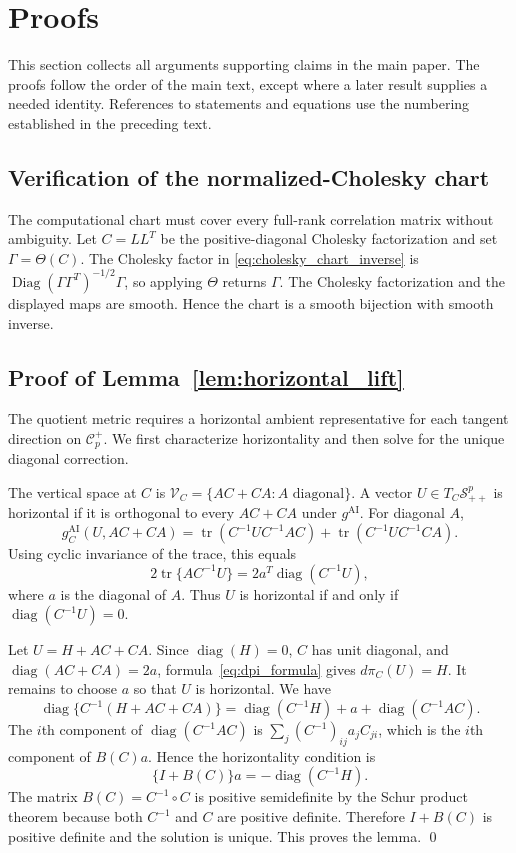\documentclass[
  12pt]{article}
\newcommand{\SPD}{\mathcal S_{++}}
\newcommand{\Corr}{\mathcal C^+}
\newcommand{\diag}{\operatorname{diag}}
\newcommand{\Diag}{\operatorname{Diag}}
\newcommand{\tr}{\operatorname{tr}}
\newcommand{\AI}{\mathrm{AI}}
\newcommand{\Had}{\circ}
\begin{document}
\section{Proofs}\label{sec:supp_proofs}

This section collects all arguments supporting claims in the main paper. The proofs follow the order of the main text, except where a later result supplies a needed identity. References to statements and equations use the numbering established in the preceding text.

\subsection{Verification of the normalized-Cholesky chart}\label{sec:supp_chart}

The computational chart must cover every full-rank correlation matrix without ambiguity. Let $C=L L^T$ be the positive-diagonal Cholesky factorization and set $\Gamma=\Theta(C)$. The Cholesky factor in \eqref{eq:cholesky_chart_inverse} is $\Diag(\Gamma\Gamma^T)^{-1/2}\Gamma$, so applying $\Theta$ returns $\Gamma$. The Cholesky factorization and the displayed maps are smooth. Hence the chart is a smooth bijection with smooth inverse.

\subsection{Proof of Lemma~\ref{lem:horizontal_lift}}

The quotient metric requires a horizontal ambient representative for each tangent direction on $\Corr_p$. We first characterize horizontality and then solve for the unique diagonal correction.

The vertical space at $C$ is $\mathcal V_C=\{AC+CA:A\text{ diagonal}\}$. A vector $U\in T_C\SPD^p$ is horizontal if it is orthogonal to every $AC+CA$ under $g^{\AI}$. For diagonal $A$,
\[
g_C^{\AI}(U,AC+CA)=\tr(C^{-1}U C^{-1}AC)+\tr(C^{-1}UC^{-1}CA).
\]
Using cyclic invariance of the trace, this equals
\[
2\tr\{A C^{-1}U\}=2a^T\diag(C^{-1}U),
\]
where $a$ is the diagonal of $A$. Thus $U$ is horizontal if and only if $\diag(C^{-1}U)=0$.

Let $U=H+AC+CA$. Since $\diag(H)=0$, $C$ has unit diagonal, and $\diag(AC+CA)=2a$, formula~\eqref{eq:dpi_formula} gives $d\pi_C(U)=H$. It remains to choose $a$ so that $U$ is horizontal. We have
\[
\diag\{C^{-1}(H+AC+CA)\}=\diag(C^{-1}H)+a+\diag(C^{-1}AC).
\]
The $i$th component of $\diag(C^{-1}AC)$ is $\sum_j(C^{-1})_{ij}a_jC_{ji}$, which is the $i$th component of $B(C)a$. Hence the horizontality condition is
\[
\{I+B(C)\}a=-\diag(C^{-1}H).
\]
The matrix $B(C)=C^{-1}\Had C$ is positive semidefinite by the Schur product theorem because both $C^{-1}$ and $C$ are positive definite. Therefore $I+B(C)$ is positive definite and the solution is unique. This proves the lemma. \qed
\end{document}
